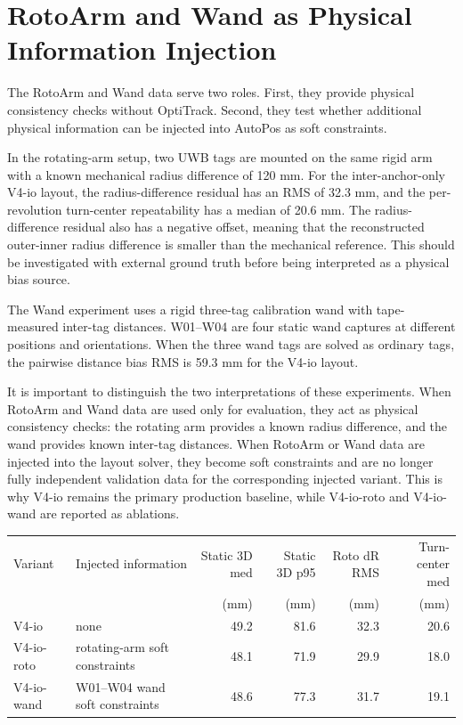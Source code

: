 \documentclass[11pt]{article}
\begin{document}
\section{RotoArm and Wand as Physical Information Injection}

The RotoArm and Wand data serve two roles. First, they provide physical consistency checks without OptiTrack. Second, they test whether additional physical information can be injected into AutoPos as soft constraints.

In the rotating-arm setup, two UWB tags are mounted on the same rigid arm with a known mechanical radius difference of 120 mm. For the inter-anchor-only V4-io layout, the radius-difference residual has an RMS of 32.3 mm, and the per-revolution turn-center repeatability has a median of 20.6 mm. The radius-difference residual also has a negative offset, meaning that the reconstructed outer-inner radius difference is smaller than the mechanical reference. This should be investigated with external ground truth before being interpreted as a physical bias source.

The Wand experiment uses a rigid three-tag calibration wand with tape-measured inter-tag distances. W01--W04 are four static wand captures at different positions and orientations. When the three wand tags are solved as ordinary tags, the pairwise distance bias RMS is 59.3 mm for the V4-io layout.

It is important to distinguish the two interpretations of these experiments. When RotoArm and Wand data are used only for evaluation, they act as physical consistency checks: the rotating arm provides a known radius difference, and the wand provides known inter-tag distances. When RotoArm or Wand data are injected into the layout solver, they become soft constraints and are no longer fully independent validation data for the corresponding injected variant. This is why V4-io remains the primary production baseline, while V4-io-roto and V4-io-wand are reported as ablations.

\begin{center}
\small
\setlength{\tabcolsep}{4pt}
\begin{tabular}{l l r r r r}
\toprule
Variant & Injected information & Static 3D med & Static 3D p95 & Roto dR RMS & Turn-center med \\
 & & (mm) & (mm) & (mm) & (mm) \\
\midrule
V4-io & none & 49.2 & 81.6 & 32.3 & 20.6 \\
V4-io-roto & rotating-arm soft constraints & 48.1 & 71.9 & 29.9 & 18.0 \\
V4-io-wand & W01--W04 wand soft constraints & 48.6 & 77.3 & 31.7 & 19.1 \\
\bottomrule
\end{tabular}
\end{center}
\end{document}
